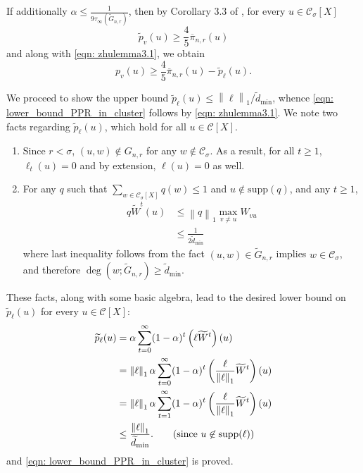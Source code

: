 \documentclass[11pt,twoside]{article}
\newcommand{\norm}[1]{\left\lVert#1\right\rVert}
\newcommand{\1}{\mathbf{1}}
\newcommand{\pbf}{p}        %
\newcommand{\pibf}{\pi}
\newcommand{\Xbf}{X}             %
\newcommand{\Wbf}{W}
\newcommand{\Cset}{\mathcal{C}}
\newcommand{\Csig}{\Cset_{\sigma}}
\newcommand{\degminwt}{\widetilde{d}_{\min}}
\begin{document}
	If additionally $\alpha \leq \frac{1}{9\tau_{\infty}(\widetilde{G}_{n,r})}$, then by Corollary 3.3 of \citep{zhu2013}, for every $u \in \Csig[\Xbf]$
	\begin{equation*}
	\widetilde{\pbf}_v(u) \geq \frac{4}{5} \overline{\pibf}_{n,r}(u)
	\end{equation*}
	and along with \eqref{eqn: zhulemma3.1}, we obtain
	\begin{equation*}
	\pbf_v(u) \geq \frac{4}{5} \overline{\pibf}_{n,r}(u) - \widetilde{\pbf}_{\ell}(u).
	\end{equation*}
	
	We proceed to show the upper bound $\widetilde{\pbf}_{\ell}(u) \leq \norm{\ell}_1 / \degminwt$, whence \eqref{eqn: lower_bound_PPR_in_cluster} follows by \eqref{eqn: zhulemma3.1}. We note two facts regarding $\widetilde{\pbf}_{\ell}(u)$, which hold for all $u \in \Cset[\Xbf]$. 
	\begin{enumerate}
		\item Since $r < \sigma$, $(u,w) \not\in G_{n,r}$ for any $w \not\in \Csig$. As a result, for all $t \geq 1$, $\ell_t(u) = 0$ and by extension, $\ell(u) = 0$ as well.
		\item For any $q$ such that $\sum_{w \in \Csig[\Xbf]} q(w) \leq 1$ and $u \not\in \mathrm{supp}(q)$, and any $t \geq 1$,
		\begin{align}
		\label{eqn: one_step_bound}
		q \widetilde{\Wbf}^t (u) & \leq \norm{q}_1 \max_{v \neq u} W_{vu} \nonumber \\
		& \leq \frac{1}{2\degminwt} 
		\end{align}
		where last inequality follows from the fact $(u,w) \in \widetilde{G}_{n,r}$ implies $w \in \Csig$, and therefore $\deg(w; \widetilde{G}_{n,r}) \geq \degminwt$.
	\end{enumerate}
	
	These facts, along with some basic algebra, lead to the desired lower bound on $\widetilde{\pbf}_{\ell}(u)$ for every $u \in \Cset[\Xbf]$:
	\begin{align*}
	\widetilde{\pbf}_{\ell}(u) & = \alpha \sum_{t = 0}^{\infty} (1 - \alpha)^t \left(\ell \widetilde{\Wbf}^t \right)(u)  \nonumber \\
	& = \norm{\ell}_1 \alpha \sum_{t = 0}^{\infty} (1 - \alpha)^t \left(\frac{\ell}{\norm{\ell}_1}  \widetilde{\Wbf}^t \right)(u)\nonumber \\
	& = \norm{\ell}_1 \alpha \sum_{t = 1}^{\infty} (1 - \alpha)^t \left(\frac{\ell}{\norm{\ell}_1}  \widetilde{\Wbf}^t \right)(u)\nonumber \\
	& \leq \frac{\norm{\ell}_1 }{\degminwt}. \tag{since $u \not\in \mathrm{supp}(\ell)$}
	\end{align*}
	and \eqref{eqn: lower_bound_PPR_in_cluster} is proved.
	
\end{document}
